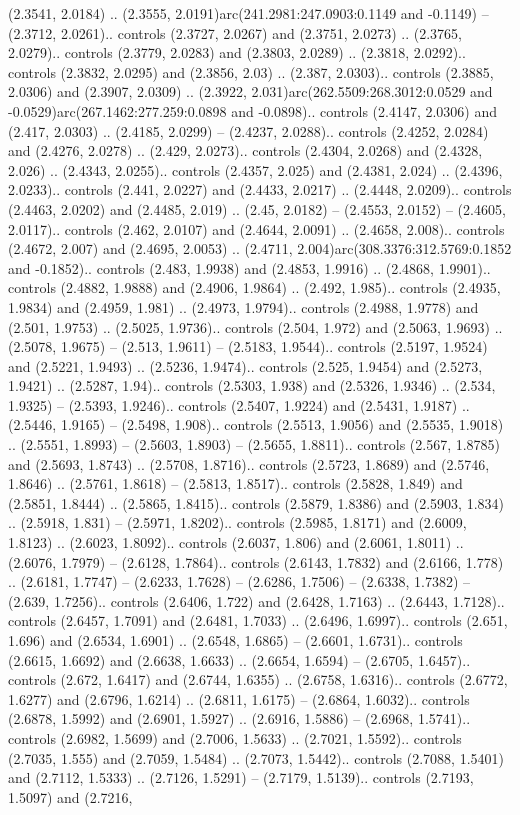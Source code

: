 (2.3541, 2.0184) .. (2.3555, 2.0191)arc(241.2981:247.0903:0.1149 and -0.1149) -- (2.3712, 2.0261).. controls (2.3727, 2.0267) and (2.3751, 2.0273) .. (2.3765, 2.0279).. controls (2.3779, 2.0283) and (2.3803, 2.0289) .. (2.3818, 2.0292).. controls (2.3832, 2.0295) and (2.3856, 2.03) .. (2.387, 2.0303).. controls (2.3885, 2.0306) and (2.3907, 2.0309) .. (2.3922, 2.031)arc(262.5509:268.3012:0.0529 and -0.0529)arc(267.1462:277.259:0.0898 and -0.0898).. controls (2.4147, 2.0306) and (2.417, 2.0303) .. (2.4185, 2.0299) -- (2.4237, 2.0288).. controls (2.4252, 2.0284) and (2.4276, 2.0278) .. (2.429, 2.0273).. controls (2.4304, 2.0268) and (2.4328, 2.026) .. (2.4343, 2.0255).. controls (2.4357, 2.025) and (2.4381, 2.024) .. (2.4396, 2.0233).. controls (2.441, 2.0227) and (2.4433, 2.0217) .. (2.4448, 2.0209).. controls (2.4463, 2.0202) and (2.4485, 2.019) .. (2.45, 2.0182) -- (2.4553, 2.0152) -- (2.4605, 2.0117).. controls (2.462, 2.0107) and (2.4644, 2.0091) .. (2.4658, 2.008).. controls (2.4672, 2.007) and (2.4695, 2.0053) .. (2.4711, 2.004)arc(308.3376:312.5769:0.1852 and -0.1852).. controls (2.483, 1.9938) and (2.4853, 1.9916) .. (2.4868, 1.9901).. controls (2.4882, 1.9888) and (2.4906, 1.9864) .. (2.492, 1.985).. controls (2.4935, 1.9834) and (2.4959, 1.981) .. (2.4973, 1.9794).. controls (2.4988, 1.9778) and (2.501, 1.9753) .. (2.5025, 1.9736).. controls (2.504, 1.972) and (2.5063, 1.9693) .. (2.5078, 1.9675) -- (2.513, 1.9611) -- (2.5183, 1.9544).. controls (2.5197, 1.9524) and (2.5221, 1.9493) .. (2.5236, 1.9474).. controls (2.525, 1.9454) and (2.5273, 1.9421) .. (2.5287, 1.94).. controls (2.5303, 1.938) and (2.5326, 1.9346) .. (2.534, 1.9325) -- (2.5393, 1.9246).. controls (2.5407, 1.9224) and (2.5431, 1.9187) .. (2.5446, 1.9165) -- (2.5498, 1.908).. controls (2.5513, 1.9056) and (2.5535, 1.9018) .. (2.5551, 1.8993) -- (2.5603, 1.8903) -- (2.5655, 1.8811).. controls (2.567, 1.8785) and (2.5693, 1.8743) .. (2.5708, 1.8716).. controls (2.5723, 1.8689) and (2.5746, 1.8646) .. (2.5761, 1.8618) -- (2.5813, 1.8517).. controls (2.5828, 1.849) and (2.5851, 1.8444) .. (2.5865, 1.8415).. controls (2.5879, 1.8386) and (2.5903, 1.834) .. (2.5918, 1.831) -- (2.5971, 1.8202).. controls (2.5985, 1.8171) and (2.6009, 1.8123) .. (2.6023, 1.8092).. controls (2.6037, 1.806) and (2.6061, 1.8011) .. (2.6076, 1.7979) -- (2.6128, 1.7864).. controls (2.6143, 1.7832) and (2.6166, 1.778) .. (2.6181, 1.7747) -- (2.6233, 1.7628) -- (2.6286, 1.7506) -- (2.6338, 1.7382) -- (2.639, 1.7256).. controls (2.6406, 1.722) and (2.6428, 1.7163) .. (2.6443, 1.7128).. controls (2.6457, 1.7091) and (2.6481, 1.7033) .. (2.6496, 1.6997).. controls (2.651, 1.696) and (2.6534, 1.6901) .. (2.6548, 1.6865) -- (2.6601, 1.6731).. controls (2.6615, 1.6692) and (2.6638, 1.6633) .. (2.6654, 1.6594) -- (2.6705, 1.6457).. controls (2.672, 1.6417) and (2.6744, 1.6355) .. (2.6758, 1.6316).. controls (2.6772, 1.6277) and (2.6796, 1.6214) .. (2.6811, 1.6175) -- (2.6864, 1.6032).. controls (2.6878, 1.5992) and (2.6901, 1.5927) .. (2.6916, 1.5886) -- (2.6968, 1.5741).. controls (2.6982, 1.5699) and (2.7006, 1.5633) .. (2.7021, 1.5592).. controls (2.7035, 1.555) and (2.7059, 1.5484) .. (2.7073, 1.5442).. controls (2.7088, 1.5401) and (2.7112, 1.5333) .. (2.7126, 1.5291) -- (2.7179, 1.5139).. controls (2.7193, 1.5097) and (2.7216, 